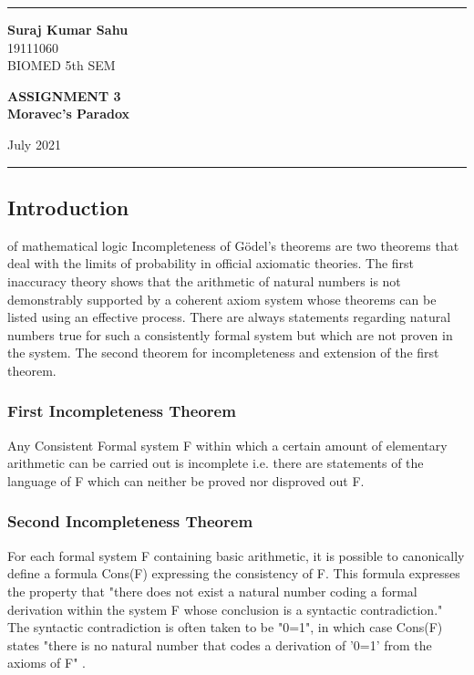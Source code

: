 \documentclass[12pt,a4paper]{article}
\begin{document}
    
    \hrule \medskip %
    \begin{minipage}{0.3\textwidth}
    \raggedright
    \small
    \textbf{Suraj Kumar Sahu}
    \\
    19111060
    \\
    BIOMED 5th SEM
    
    \end{minipage}
    \begin{minipage}{0.45\textwidth} 
    \centering 
    \large 
    \textbf{ASSIGNMENT 3}\\
    \normalsize 
    \textbf{Moravec’s Paradox}\\ 
    \end{minipage}
    \begin{minipage}{0.2\textwidth}
     July 2021 \hfill\\
    \end{minipage}
    \medskip\hrule 
    \bigskip

\subsection*{Introduction} of mathematical logic
Incompleteness of Gödel's theorems are two theorems that deal with the limits of probability in official axiomatic theories. The first inaccuracy theory shows that the arithmetic of natural numbers is not demonstrably supported by a coherent axiom system whose theorems can be listed using an effective process. There are always statements regarding natural numbers true for such a consistently formal system but which are not proven in the system. The second theorem for incompleteness and extension of the first theorem.

\subsubsection*{First Incompleteness Theorem  } 
Any Consistent Formal system F within which a certain amount of elementary arithmetic can be carried out is incomplete i.e. there are statements of the language of F which can neither be proved nor disproved out F.

\subsubsection*{Second Incompleteness Theorem  } 
For each formal system F containing basic arithmetic, it is possible to canonically define a formula Cons(F) expressing the consistency of F. This formula expresses the property that "there does not exist a natural number coding a formal derivation within the system F whose conclusion is a syntactic contradiction." The syntactic contradiction is often taken to be "0=1", in which case Cons(F) states "there is no natural number that codes a derivation of '0=1' from the axioms of F" .
\end{document}

